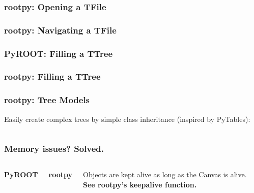 \documentclass[10pt,professionalfonts,serif,usenames,dvipsnames,svgnames,table]{beamer}
\begin{document}
\begin{frame}[fragile]
    \frametitle{rootpy: Opening a TFile}

    
    \vspace{-.5cm}
    
\end{frame}

\begin{frame}[fragile]
    \frametitle{rootpy: Navigating a TFile}
    
    \vspace{-.5cm}
    
\end{frame}

\begin{frame}[fragile]
    \frametitle{PyROOT: Filling a TTree}
    
\end{frame}

\begin{frame}[fragile]
    \frametitle{rootpy: Filling a TTree}
    
\end{frame}

\begin{frame}[fragile]
    \frametitle{rootpy: Tree Models}
    Easily create complex trees by simple class inheritance (inspired by
    PyTables):
    \vspace{-.5cm}
    \begin{columns}
    
    
    \end{columns}
\end{frame}

\begin{frame}[fragile]
    \frametitle{Memory issues? Solved.}
    \begin{columns}
        {\bf PyROOT}
    
        {\bf rootpy}
    
    Objects are kept alive as long as the Canvas is alive. \\
    {\bf See rootpy's keepalive function.}
    \end{columns}
\end{frame}
\end{document}
